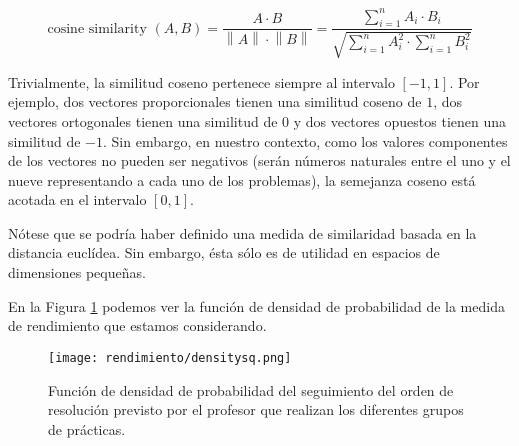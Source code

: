 \begin{equation}
\text{cosine similarity }(A,B) = \frac{A\cdot B}{\left\lVert A \right\rVert \cdot \left\lVert B \right\rVert} = \frac{\sum_{i=1}^n {A_i \cdot B_i}}{\sqrt{\sum_{i=1}^n{A_i^2} \cdot \sum_{i=1}^n {B_i^2}}}
\label{eq:cosinesimilarity}
\end{equation}

Trivialmente, la similitud coseno pertenece siempre al intervalo $[-1,1]$. Por ejemplo, dos vectores proporcionales tienen una similitud coseno de $1$, dos vectores ortogonales tienen una similitud de $0$ y dos vectores opuestos tienen una similitud de $-1$. Sin embargo, en nuestro contexto, como los valores componentes de los vectores no pueden ser negativos (serán números naturales entre el uno y el nueve representando a cada uno de los problemas), la semejanza coseno está acotada en el intervalo $[0,1]$.

Nótese que se podría haber definido una medida de similaridad basada en la distancia euclídea. Sin embargo, ésta sólo es de utilidad en espacios de dimensiones pequeñas.

En la Figura \ref{fig:densityplotsq} podemos ver la función de densidad de probabilidad de la medida de rendimiento que estamos considerando.

\begin{figure}[H]
    \centering
    \texttt{[image: rendimiento/densitysq.png]}
    \caption{Función de densidad de probabilidad del seguimiento del orden de resolución previsto por el profesor que realizan los diferentes grupos de prácticas.}
    \label{fig:densityplotsq}
\end{figure}